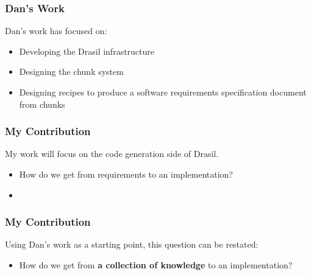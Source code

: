 \documentclass{beamer}
\begin{document}

\begin{frame}

\frametitle{Dan's Work}

Dan's work has focused on:
\begin{itemize}
\item Developing the Drasil infrastructure 
\item Designing the chunk system
\item Designing recipes to produce a software requirements specification document from chunks
\end{itemize}

\end{frame}



\begin{frame}

\frametitle{My Contribution}

My work will focus on the code generation side of Drasil.

\begin{itemize}
\item[] How do we get from requirements to an implementation?
\item[]
\end{itemize}


\end{frame}



\begin{frame}

\frametitle{My Contribution}

Using Dan's work as a starting point, this question can be restated:

\begin{itemize}
\item[] How do we get from {\bf a collection of knowledge} to an implementation?
\end{itemize}


\end{frame}

\end{document}
